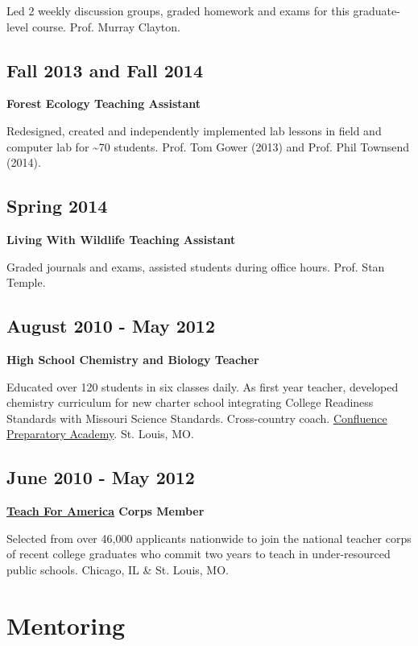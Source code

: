 \documentclass{article}
\begin{document}
Led 2 weekly discussion groups, graded homework and exams for this
graduate-level course. Prof. Murray Clayton.

\subsection*{Fall 2013 and Fall 2014}
\label{sec:orga43c637}
\textbf{Forest Ecology Teaching Assistant}

Redesigned, created and independently implemented lab lessons in field and computer lab for \textasciitilde{}70
students.  Prof. Tom Gower (2013) and Prof. Phil Townsend (2014).

\subsection*{Spring 2014}
\label{sec:org8ab2d88}
\textbf{Living With Wildlife Teaching Assistant}

Graded journals and exams, assisted students during office hours.
Prof. Stan Temple.

\subsection*{August 2010 - May 2012}
\label{sec:org05e4b75}
\textbf{High School Chemistry and Biology Teacher}

Educated over 120 students in six classes daily. As first year
teacher, developed chemistry curriculum for new charter school
integrating College Readiness Standards with Missouri Science
Standards. Cross-country coach. \href{https://www.google.com/search?q=Confluence+Preparatory+Academy+St.+Louis\&oq=Confluence+Prep+Academy+St.+Louis\&aqs=chrome..69i57.7294j0j8\&sourceid=chrome\&ie=UTF-8\#q=Confluence+Prep+Academy+High+School+St.+Louis}{Confluence Preparatory Academy}. St. Louis, MO.

\subsection*{June 2010 - May 2012}
\label{sec:orgd3cb14a}
\textbf{\href{https://www.teachforamerica.org/}{Teach For America} Corps Member}

Selected from over 46,000 applicants nationwide to join the national
teacher corps of recent college graduates who commit two years to
teach in under-resourced public schools.  Chicago, IL \& St. Louis, MO.

\section*{Mentoring}
\label{sec:org9b171ac}
\end{document}
